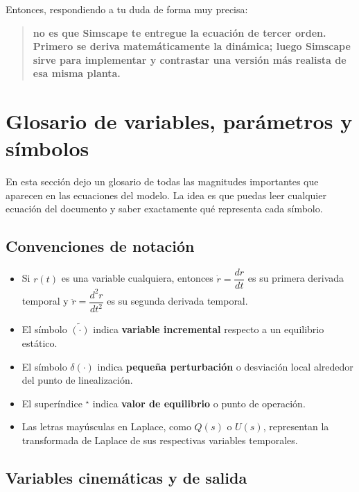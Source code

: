 \documentclass[11pt]{article}
\begin{document}
Entonces, respondiendo a tu duda de forma muy precisa:

\begin{quote}
\textbf{no es que Simscape te entregue la ecuaci\'on de tercer orden. Primero se deriva matem\'aticamente la din\'amica; luego Simscape sirve para implementar y contrastar una versi\'on m\'as realista de esa misma planta.}
\end{quote}

\section{Glosario de variables, par\'ametros y s\'imbolos}

En esta secci\'on dejo un glosario de todas las magnitudes importantes que aparecen en las ecuaciones del modelo. La idea es que puedas leer cualquier ecuaci\'on del documento y saber exactamente qu\'e representa cada s\'imbolo.

\subsection{Convenciones de notaci\'on}

\begin{itemize}[leftmargin=1.2cm]
\item Si $r(t)$ es una variable cualquiera, entonces $\dot r = \dfrac{dr}{dt}$ es su primera derivada temporal y $\ddot r = \dfrac{d^2r}{dt^2}$ es su segunda derivada temporal.
\item El s\'imbolo $\tilde{(\cdot)}$ indica \textbf{variable incremental} respecto a un equilibrio est\'atico.
\item El s\'imbolo $\delta(\cdot)$ indica \textbf{peque\~na perturbaci\'on} o desviaci\'on local alrededor del punto de linealizaci\'on.
\item El super\'indice ${}^\star$ indica \textbf{valor de equilibrio} o punto de operaci\'on.
\item Las letras may\'usculas en Laplace, como $Q(s)$ o $U(s)$, representan la transformada de Laplace de sus respectivas variables temporales.
\end{itemize}

\subsection{Variables cinem\'aticas y de salida}
\end{document}
